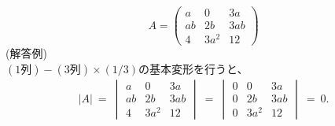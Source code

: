\documentclass[a4paper,11pt,fleqn]{jarticle}
\begin{document}
\subsubsection{}
\begin{equation*}
A=
\begin{pmatrix}
a &0 &3a \\
ab &2b &3ab \\
4 &3a^2 &12
\end{pmatrix}
\end{equation*}
(解答例)\\
$(1列)-(3列)\times (1/3)$の基本変形を行うと、
\begin{eqnarray*}
|A|~=~
\begin{vmatrix}
a &0 &3a \\
ab &2b &3ab \\
4 &3a^2 &12
\end{vmatrix}
~=~\begin{vmatrix}
0 &0 &3a \\
0 &2b &3ab \\
0 &3a^2 &12
\end{vmatrix} ~=~ 0.
\end{eqnarray*}


\newpage
\end{document}
